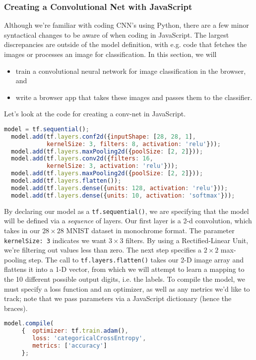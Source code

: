 \documentclass[12pt]{article}
\begin{document}
\subsubsection{Creating a Convolutional Net with JavaScript} Although we're familiar with coding CNN's using Python, there are a few minor syntactical changes to be aware of when coding in JavaScript. The largest discrepancies are outside of the model definition, with e.g. code that fetches the images or processes an image for classification. In this section, we will
\begin{itemize}
\item train a convolutional neural network for image classification in the   browser, and
\item write a browser app that takes these images and passes them to the classifier.
\end{itemize}
Let's look at the code for creating a conv-net in JavaScript.
\begin{lstlisting}[language=JavaScript]
  model = tf.sequential();
  model.add(tf.layers.conf2d({inputShape: [28, 28, 1],
            kernelSize: 3, filters: 8, activation: 'relu'}));
  model.add(tf.layers.maxPooling2d({poolSize: [2, 2]}));
  model.add(tf.layers.conv2d({filters: 16,
            kernelSize: 3, activation: 'relu'}));
  model.add(tf.layers.maxPooling2d({poolSize: [2, 2]}));
  model.add(tf.layers.flatten());
  model.add(tf.layers.dense({units: 128, activation: 'relu'}));
  model.add(tf.layers.dense({units: 10, activation: 'softmax'}));
\end{lstlisting}
By declaring our model as a \texttt{tf.sequential()}, we are specifying that the model will be defined via a \emph{sequence} of layers. Our first layer is a 2-d convolution, which takes in our $28 \times 28$ MNIST dataset in monochrome format. The parameter \texttt{kernelSize: 3} indicates we want $3 \times 3$ filters. By using a Rectified-Linear Unit, we're filtering out values less than zero. The next step specifies a $2 \times 2$ max-pooling step. The call to \texttt{tf.layers.flatten()} takes our 2-D image array and flattens it into a 1-D vector, from which we will attempt to learn a mapping to the 10 different possible output digits, i.e. the labels. To compile the model, we must specify a loss function and an optimizer, as well as any metrics we'd like to track; note that we pass parameters via a JavaScript dictionary (hence the braces).
\begin{lstlisting}[language=JavaScript]
  model.compile(
     {  optimizer: tf.train.adam(),
        loss: 'categoricalCrossEntropy',
        metrics: ['accuracy']
     };
\end{lstlisting}
\end{document}
